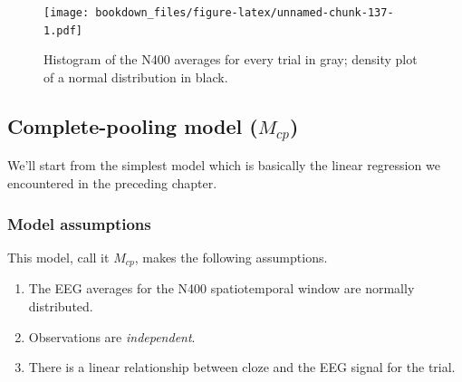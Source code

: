 \documentclass[12pt,]{krantz}
\newenvironment{Shaded}{\begin{snugshade}}{\end{snugshade}}
\newcommand{\KeywordTok}[1]{\textcolor[rgb]{0.13,0.29,0.53}{\textbf{#1}}}
\newcommand{\DataTypeTok}[1]{\textcolor[rgb]{0.13,0.29,0.53}{#1}}
\newcommand{\DecValTok}[1]{\textcolor[rgb]{0.00,0.00,0.81}{#1}}
\newcommand{\FloatTok}[1]{\textcolor[rgb]{0.00,0.00,0.81}{#1}}
\newcommand{\StringTok}[1]{\textcolor[rgb]{0.31,0.60,0.02}{#1}}
\newcommand{\OperatorTok}[1]{\textcolor[rgb]{0.81,0.36,0.00}{\textbf{#1}}}
\newcommand{\NormalTok}[1]{#1}
\providecommand{\tightlist}{%
  \setlength{\itemsep}{0pt}\setlength{\parskip}{0pt}}
\theoremstyle{definition}
\theoremstyle{definition}
\theoremstyle{definition}
\theoremstyle{remark}
\begin{document}
\begin{Shaded}
\end{Shaded}

\begin{figure}
\centering
\texttt{[image: bookdown\_files/figure-latex/unnamed-chunk-137-1.pdf]}
\caption{\label{fig:unnamed-chunk-137}Histogram of the N400 averages for
every trial in gray; density plot of a normal distribution in black.}
\end{figure}

\subsection{\texorpdfstring{Complete-pooling model
(\(M_{cp}\))}{Complete-pooling model (M\_\{cp\})}}\label{complete-pooling-model-m_cp}

We'll start from the simplest model which is basically the linear
regression we encountered in the preceding chapter.

\subsubsection{Model assumptions}\label{model-assumptions}

This model, call it \(M_{cp}\), makes the following assumptions.

\begin{enumerate}
\def\labelenumi{\arabic{enumi}.}
\tightlist
\item
  The EEG averages for the N400 spatiotemporal window are normally
  distributed.
\item
  Observations are \emph{independent}.
\item
  There is a linear relationship between cloze and the EEG signal for
  the trial.
\end{enumerate}
\end{document}
